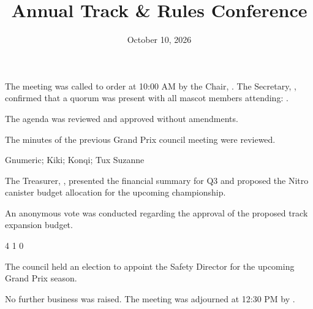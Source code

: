 \documentclass[language=english]{meetingminutes}
\title{Annual Track \& Rules Conference}
\date{October 10, 2026}
\begin{document}
\maketitle



The meeting was called to order at 10:00 AM by the Chair, \chair. 
The Secretary, \secretary, confirmed that a quorum was present with all mascot members attending: \everyone.

The agenda was reviewed and approved without amendments.


The minutes of the previous Grand Prix council meeting were reviewed.

  {Gnumeric; Kiki; Konqi; Tux} %
  {}                            %
  {Suzanne}                     %


The Treasurer, \treasurer, presented the financial summary for Q3 and proposed the Nitro canister budget allocation for the upcoming championship.


An anonymous vote was conducted regarding the approval of the proposed track expansion budget.

  {4} %
  {1} %
  {0} %


The council held an election to appoint the Safety Director for the upcoming Grand Prix season.

  {
  }



No further business was raised. The meeting was adjourned at 12:30 PM by \chair.


\printtasks
\end{document}
